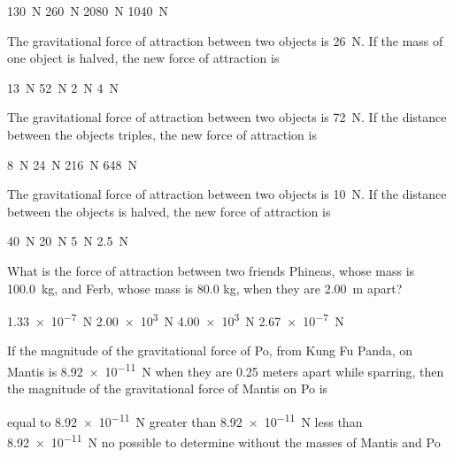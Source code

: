 \documentclass[]{exam}
\theoremstyle{definition}
\begin{document}
\begin{questions}
\begin{randomizechoices}
    \correctchoice \SI{130}{N}
    \choice \SI{260}{N}
    \choice \SI{2080}{N}
    \choice \SI{1040}{N}
\end{randomizechoices}

\question
The gravitational force of attraction between two objects is \SI{26}{N}. If the mass of one object is halved, the new force of attraction is

\begin{randomizechoices}
    \correctchoice \SI{13}{N}
    \choice \SI{52}{N}
    \choice \SI{2}{N}
    \choice \SI{4}{N}
\end{randomizechoices}

\question
The gravitational force of attraction between two objects is \SI{72}{N}. If the distance between the objects triples, the new force of attraction is

\begin{randomizechoices}
    \correctchoice \SI{8}{N}
    \choice \SI{24}{N}
    \choice \SI{216}{N}
    \choice \SI{648}{N}
\end{randomizechoices}

\question
The gravitational force of attraction between two objects is \SI{10}{N}. If the distance between the objects is halved, the new force of attraction is

\begin{randomizechoices}
    \correctchoice \SI{40}{N}
    \choice \SI{20}{N}
    \choice \SI{5}{N}
    \choice \SI{2.5}{N}
\end{randomizechoices}

\question
What is the force of attraction between two friends Phineas, whose mass is \SI{100.0}{kg}, and Ferb, whose mass is 80.0 kg, when they are \SI{2.00}{m} apart? 

\begin{randomizechoices}
    \correctchoice \SI{1.33e-7}{N}
    \choice \SI{2.00e3}{N}
    \choice \SI{4.00e3}{N}
    \choice \SI{2.67e-7}{N}
\end{randomizechoices}

\question
If the magnitude of the gravitational force of Po, from Kung Fu Panda, on Mantis is \SI{8.92e-11}{N} when they are 0.25 meters apart while sparring, then the magnitude of the gravitational force of Mantis on Po is

\begin{randomizechoices}[keeplast]
    \correctchoice equal to \SI{8.92e-11}{N}
    \choice greater than \SI{8.92e-11}{N}
    \choice less than \SI{8.92e-11}{N}
    \choice no possible to determine without the masses of Mantis and Po
\end{randomizechoices}    
\end{questions}
\end{document}

